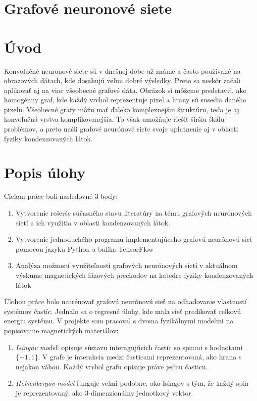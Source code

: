 \documentclass{article}
\begin{document}
\section*{Grafové neuronové siete}

\section*{Úvod}
Konvolučné neuronové siete sú v dnešnej dobe už známe a často používané na obrazových dátach, kde dosahujú veľmi dobré výsledky. Preto sa neskôr začali aplikovať aj na viac všeobecné grafové dáta. Obrázok si môžeme predstaviť, ako homogénny graf, kde každý vrchol reprezentuje pixel a hrany sú susedia daného pixelu. Všeobecné grafy môžu mať ďaleko komplexnejšiu štruktúru, teda je aj konvolučná vrstva komplikovanejšia. To však umožňuje riešiť širšiu škálu problémov, a preto našli grafové neurónové siete svoje uplatnenie aj v oblasti fyziky kondenzovaných látok.

\section*{Popis úlohy}
Cieľom práce boli nasledovné 3 body: 
\begin{enumerate}
    \item Vytvorenie rešerše súčasného stavu literatúry na tému grafových neurónových sietí a ich
    využitia v oblasti kondenzovaných látok.
    \item Vytvorenie jednoduchého programu implementujúceho grafovú neurónovú sieť pomocou jazyku
    Python a balíka TensorFlow
    \item Analýza možností využiteľnosti grafových neurónových sietí v aktuálnom výskume magnetických
    fázových prechodov na katedre fyziky kondenzovaných látok
\end{enumerate}

Úlohou práce bolo natrénovať grafovú neurónovú sieť na odhadovanie vlastností systémov častíc. Jednalo sa o regresné úlohy, kde mala sieť predikovať celkovú energiu systému. V projekte som pracoval s dvoma fyzikálnymi modelmi na popisovanie magnetických materiálov:
\begin{enumerate}
    \item \textit{Isingov model}: opisuje sústavu interagujúcich častíc so spinmi s hodnotami $\{-1, 1\}$. V grafe je interakcia medzi časticami reprezentovaná, ako hrana s nejakou váhou. Každý vrchol grafu opisuje práve jednu časticu.
    \item \textit{Heisenbergov model} funguje veľmi podobne, ako Isingov s tým, že každý spin je reprezentovaný, ako 3-dimenzionálny jednotkový vektor.
\end{enumerate}  
\end{document}
